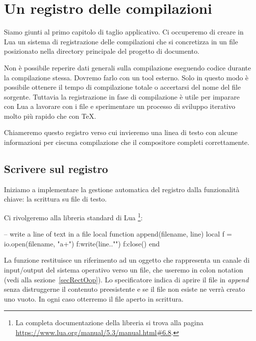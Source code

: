 

\chapter{Un registro delle compilazioni}
\label{iiichRegistro}

Siamo giunti al primo capitolo di taglio applicativo. Ci occuperemo di creare
in Lua un sistema di registrazione delle compilazioni che si concretizza in un
file posizionato nella directory principale del progetto di documento.

Non è possibile reperire dati generali sulla compilazione eseguendo codice
durante la compilazione stessa. Dovremo farlo con un tool esterno. Solo in
questo modo è possibile ottenere il tempo di compilazione totale o accertarsi
del nome del file sorgente. Tuttavia la registrazione in fase di compilazione è
utile per imparare con Lua a lavorare con i file e sperimentare un processo di
sviluppo iterativo molto più rapido che con \TeX.

Chiameremo questo registro  verso cui invieremo una linea di
testo con alcune informazioni per ciscuna compilazione che il compositore
completi correttamente.


\section{Scrivere sul registro}

Iniziamo a implementare la gestione automatica del registro dalla funzionalità
chiave: la scrittura su file di testo.

Ci rivolgeremo alla libreria standard di Lua \footnote{La completa
documentazione della libreria  si trova alla pagina
\url{https://www.lua.org/manual/5.3/manual.html\#6.8}.}:
\begin{lines}
-- write a line of text in a file
local function append(filename, line)
    local f = io.open(filename, "a+")
    f:write(line.."\n")
    f:close()
end
\end{lines}

La funzione  restituisce un riferimento ad un oggetto che
rappresenta un canale di input/output del sistema operativo verso un file, che
useremo in colon notation (vedi alla sezione~\ref{secRectOop}). Lo specificatore
 indica di aprire il file in \emph{append} senza distruggerne il
contenuto preesistente e se il file non esiste ne verrà creato uno vuoto. In
ogni caso otterremo il file aperto in scrittura.

